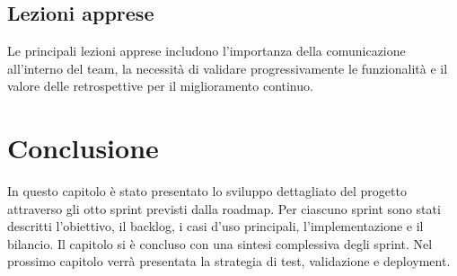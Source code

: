 \subsection{Lezioni apprese}
\label{subsec:lezioni-apprese}

Le principali lezioni apprese includono l'importanza della comunicazione all'interno del team, la necessità di validare progressivamente le funzionalità e il valore delle retrospettive per il miglioramento continuo.

\section*{Conclusione}

In questo capitolo è stato presentato lo sviluppo dettagliato del progetto attraverso gli otto sprint previsti dalla roadmap. Per ciascuno sprint sono stati descritti l'obiettivo, il backlog, i casi d'uso principali, l'implementazione e il bilancio. Il capitolo si è concluso con una sintesi complessiva degli sprint. Nel prossimo capitolo verrà presentata la strategia di test, validazione e deployment.